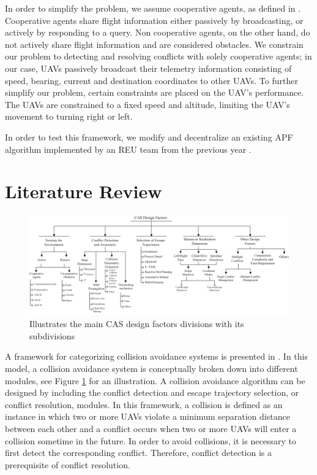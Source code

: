\documentclass[conference]{IEEEtran}
\begin{document}
In order to simplify the problem, we assume cooperative agents, as defined in \cite{roadmap2002roadmap}. Cooperative agents share flight information either passively by broadcasting, or actively by responding to a query. Non cooperative agents, on the other hand, do not actively share flight information and are considered obstacles. We constrain our problem to detecting and resolving conflicts with solely cooperative agents; in our case, UAVs passively broadcast their telemetry information consisting of speed, bearing, current and destination coordinates to other UAVs. To further simplify our problem, certain constraints are placed on the UAV’s performance.  The UAVs are constrained to a fixed speed and altitude, limiting the UAV’s movement to turning right or left. 

In order to test this framework, we modify and decentralize an existing APF algorithm implemented by an REU team from the previous year \cite{siudynamic}.


\section{Literature Review}
\label{sec:litReview}

\begin{figure}
	\includegraphics [width=1\textwidth] {09Rahim}
	\caption{Illustrates the main CAS design factors divisions with its subdivisions \cite{albaker2009survey}}
	\label{fig:09Rahim}
\end{figure}

A framework for categorizing collision avoidance systems is presented in \cite{albaker2009survey}.  In this model, a collision avoidance system is conceptually broken down into different modules, see Figure \ref{fig:09Rahim} for an illustration.  A collision avoidance algorithm can be designed by including the conflict detection and escape trajectory selection, or conflict resolution, modules.  In this framework, a collision is defined as an instance in which two or more UAVs violate a minimum separation distance between each other and a conflict occurs when two or more UAVs will enter a collision sometime in the future. In order to avoid collisions, it is necessary to first detect the corresponding conflict.  Therefore, conflict detection is a prerequisite of conflict resolution.
\end{document}
